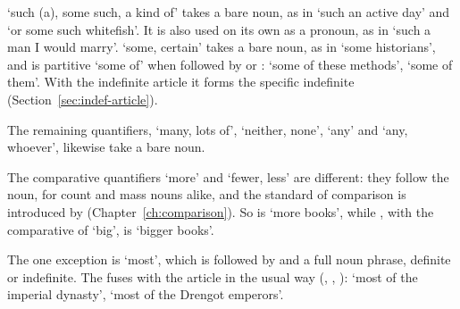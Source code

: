 `such (a), some such, a kind of' takes a bare noun, as in  `such an active day' and  `or some such whitefish'. It is also used on its own as a pronoun, as in  `such a man I would marry'.
 `some, certain' takes a bare noun, as in  `some historians', and is partitive `some of' when followed by  or :  `some of these methods',  `some of them'. With the indefinite article it forms the specific indefinite  (Section~\ref{sec:indef-article}).

The remaining quantifiers,  `many, lots of',  `neither, none',  `any' and  `any, whoever', likewise take a bare noun.

The comparative quantifiers  `more' and  `fewer, less' are different: they follow the noun, for count and mass nouns alike, and the standard of comparison is introduced by  (Chapter~\ref{ch:comparison}). So  is `more books', while , with the comparative of  `big', is `bigger books'.

The one exception is  `most', which is followed by  and a full noun phrase, definite or indefinite. The  fuses with the article in the usual way (, , ):  `most of the imperial dynasty',  `most of the Drengot emperors'.

